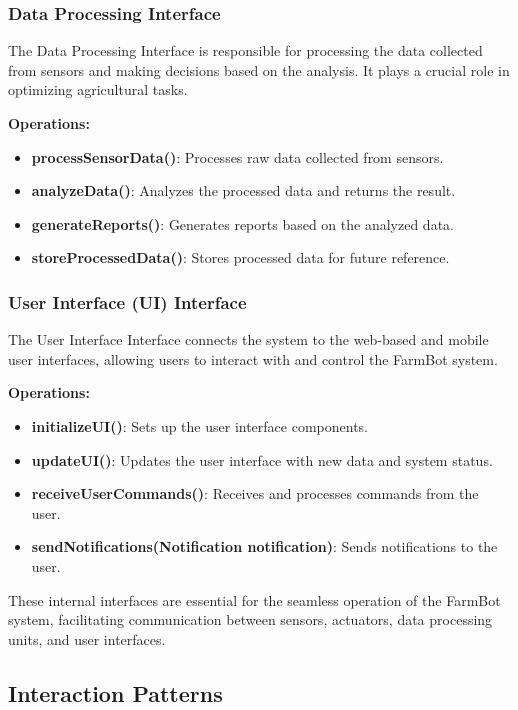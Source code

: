 \subsubsection{Data Processing Interface}

The Data Processing Interface is responsible for processing the data collected from sensors and making decisions based on the analysis. It plays a crucial role in optimizing agricultural tasks.

\textbf{Operations:}
\begin{itemize}
    \item \textbf{processSensorData()}: Processes raw data collected from sensors.
    \item \textbf{analyzeData()}: Analyzes the processed data and returns the result.
    \item \textbf{generateReports()}: Generates reports based on the analyzed data.
    \item \textbf{storeProcessedData()}: Stores processed data for future reference.
\end{itemize}

\subsubsection{User Interface (UI) Interface}

The User Interface Interface connects the system to the web-based and mobile user interfaces, allowing users to interact with and control the FarmBot system.

\textbf{Operations:}
\begin{itemize}
    \item \textbf{initializeUI()}: Sets up the user interface components.
    \item \textbf{updateUI()}: Updates the user interface with new data and system status.
    \item \textbf{receiveUserCommands()}: Receives and processes commands from the user.
    \item \textbf{sendNotifications(Notification notification)}: Sends notifications to the user.
\end{itemize}

These internal interfaces are essential for the seamless operation of the FarmBot system, facilitating communication between sensors, actuators, data processing units, and user interfaces.


\subsection{Interaction Patterns}

